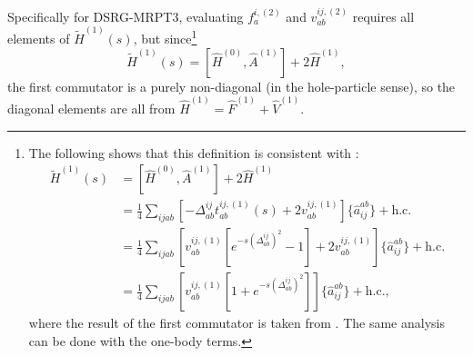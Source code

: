 \documentclass{article}
\begin{document}
Specifically for DSRG-MRPT3, evaluating $f_a^{i,(2)}$ and $v_{ab}^{ij,(2)}$ requires all elements of $\tilde{H}^{(1)}(s)$, but since\footnote{The following shows that this definition is consistent with :
\begin{align}
    \tilde{H}^{(1)}(s)&=[\hat{H}^{(0)}, \hat{A}^{(1)}]+2\hat{H}^{(1)}\\
    &=\frac{1}{4}\sum_{ijab}\left[-\Delta_{ab}^{ij}t^{ij,(1)}_{ab}(s)+2v^{ij,(1)}_{ab}\right]\{ \hat{a}^{ab}_{ij} \}+\mathrm{h.c.}\\
    &=\frac{1}{4}\sum_{ijab}\left[v^{ij,(1)}_{ab}[e^{-s(\Delta^{ij}_{ab})^2}-1]+2v^{ij,(1)}_{ab}\right]\{ \hat{a}^{ab}_{ij} \}+\mathrm{h.c.}\\
    &=\frac{1}{4}\sum_{ijab}\left[v^{ij,(1)}_{ab}[1+e^{-s(\Delta^{ij}_{ab})^2}]\right]\{ \hat{a}^{ab}_{ij} \}+\mathrm{h.c.},
\end{align}
where the result of the first commutator is taken from \cite[SI, eq. 16]{liMultireferenceDrivenSimilarity2015}. The same analysis can be done with the one-body terms.
}
\begin{equation}
    \tilde{H}^{(1)}(s)=[\hat{H}^{(0)}, \hat{A}^{(1)}]+2\hat{H}^{(1)},
\end{equation}
the first commutator is a purely non-diagonal (in the hole-particle sense), so the diagonal elements are all from $\hat{H}^{(1)}=\hat{F}^{(1)}+ \hat{V}^{(1)}$.
\end{document}
